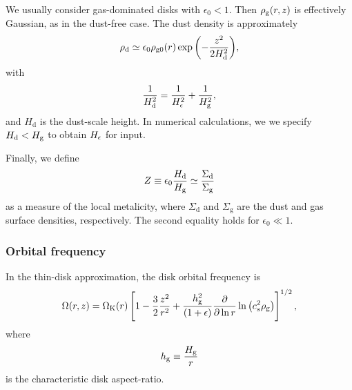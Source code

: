 We usually consider gas-dominated disks with $\epsilon_0 < 1$.  
Then $\rho_\mathrm{g}(r,z)$ is effectively Gaussian, as in the 
dust-free case. The dust density is approximately 
\begin{align}
  \rho_\mathrm{d} \simeq \epsilon_0\rho_\mathrm{g0}(r) \exp
        {\left(-\frac{z^2}{2H_\mathrm{d}^2}\right)}, 
\end{align}
with 
\begin{align}
  \frac{1}{H_\mathrm{d}^2} = \frac{1}{H_\epsilon^2} + \frac{1}{H_\mathrm{g}^2}, 
\end{align}
and $H_\mathrm{d}$ is the dust-scale height. In numerical
calculations, we  we specify $H_\mathrm{d}< H_\mathrm{g}$ to obtain 
$H_\epsilon$ for input. 

Finally, we define 
\begin{align}
  Z \equiv \epsilon_0\frac{H_\mathrm{d}}{H_\mathrm{g}} \simeq
  \frac{\Sigma_\mathrm{d}}{\Sigma_\mathrm{g}} 
\end{align}
as a measure of the local metalicity, where $\Sigma_\mathrm{d}$ and
$\Sigma_\mathrm{g}$ are the dust and gas surface densities,
respectively. The second equality holds for $\epsilon_0\ll1$.  


\subsubsection{Orbital frequency} 
In the thin-disk approximation, the disk orbital frequency is 
\begin{align}
  \Omega(r,z) = \Omega_{\rm K}(r)\left[1 - \frac{3}{2}\frac{z^2}{r^2} +
    \frac{h_\mathrm{g}^2}{\left(1+\epsilon\right)}\frac{\partial}{\partial\ln{r}}\ln{\left(c_s^2\rho_\mathrm{g}\right)}
    \right]^{1/2}, 
\end{align}
where 
\begin{align}
  h_\mathrm{g} \equiv \frac{H_\mathrm{g}}{r}
\end{align}
is the characteristic disk aspect-ratio. 


